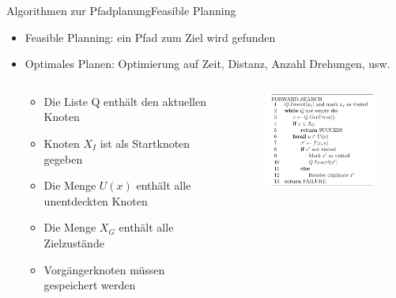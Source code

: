 \documentclass[t,aspectratio=169,dvipsnames]{beamer}
\begin{document}
\begin{frame}{Algorithmen zur Pfadplanung}{Feasible Planning}
	\begin{itemize}
		\item Feasible Planning: ein Pfad zum Ziel wird gefunden
		\item Optimales Planen: Optimierung auf Zeit, Distanz, Anzahl Drehungen, usw.
		\begin{columns}
			\begin{column}[T]{0.5\textwidth}
				\begin{itemize}[<2>]
					\item Die Liste Q enthält den aktuellen Knoten
					\item Knoten $X_I$ ist als Startknoten gegeben
					\item Die Menge $U(x)$ enthält alle unentdeckten Knoten
					\item Die Menge $X_G$ enthält alle Zielzustände
					\item Vorgängerknoten müssen gespeichert werden
				\end{itemize}
			\end{column}
			\begin{column}[T]{0.5\textwidth}
				\begin{figure}
					\includegraphics[width=6.0cm]{images/img225.png}
				\end{figure}
			\end{column}
		\end{columns}
	\end{itemize}
\end{frame}
\end{document}
